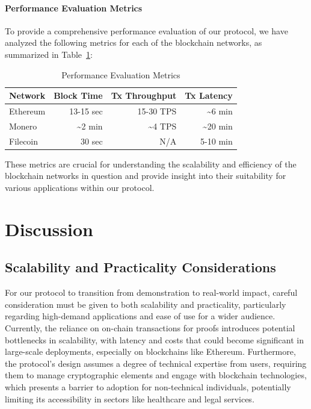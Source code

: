 \documentclass[pdftex,twocolumn,epjc3]{svjour3}
\begin{document}
\paragraph{Performance Evaluation Metrics}

To provide a comprehensive performance evaluation of our protocol, we have analyzed the following metrics for each of the blockchain networks, as summarized in Table~\ref{table:performance}:

\begin{table}[h!]
\centering
\caption{Performance Evaluation Metrics}
\label{table:performance}
\begin{tabular}{lrrr}
\hline
\textbf{Network}     & \textbf{Block Time} & \textbf{Tx Throughput} & \textbf{Tx Latency} \\ \hline
Ethereum             & 13-15 sec       & 15-30 TPS                       & \textasciitilde{}6 min      \\
Monero               & \textasciitilde{}2 min & \textasciitilde{}4 TPS             & \textasciitilde{}20 min \\
Filecoin             & 30 sec & N/A\footnotemark{}            & 5-10 min  \\ 
\hline
\end{tabular}
\end{table}



These metrics are crucial for understanding the scalability and efficiency of the blockchain networks in question and provide insight into their suitability for various applications within our protocol.

\section{Discussion}
\label{sec:discussion}

\subsection{Scalability and Practicality Considerations}

\begin{sloppypar}
For our protocol to transition from demonstration to real-world impact, careful consideration must be given to both scalability and practicality, particularly regarding high-demand applications and ease of use for a wider audience.  Currently, the reliance on on-chain transactions for proofs introduces potential bottlenecks in scalability, with latency and costs that could become significant in large-scale deployments, especially on blockchains like Ethereum.  Furthermore, the protocol's design assumes a degree of technical expertise from users, requiring them to manage cryptographic elements and engage with blockchain technologies, which presents a barrier to adoption for non-technical individuals, potentially limiting its accessibility in sectors like healthcare and legal services.
\end{sloppypar}
\end{document}
